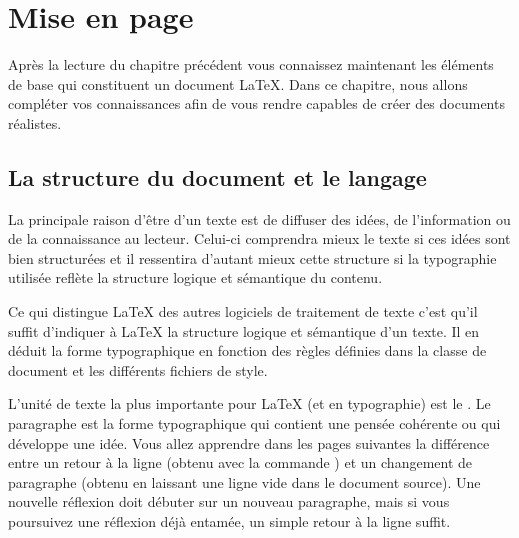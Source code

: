 

\chapter{Mise en page}
\thispagestyle{plain}

\begin{intro}
  Après la lecture du chapitre précédent vous connaissez maintenant
  les éléments de base qui constituent un document \LaTeX{}. Dans ce
  chapitre, nous allons compléter vos connaissances afin de vous
  rendre capables de créer des documents réalistes.
\end{intro}

\section{La structure du document et le langage}

La principale raison d'être d'un texte est de diffuser des idées, de
l'information ou de la connaissance au lecteur. Celui-ci comprendra
mieux le texte si ces idées sont bien structurées et il
ressentira d'autant mieux cette structure si la typographie utilisée
reflète la structure logique et sémantique du contenu.

Ce qui distingue \LaTeX{} des autres logiciels de traitement de texte
c'est qu'il suffit d'indiquer à \LaTeX{} la structure logique et
sémantique d'un texte. Il en déduit la forme typographique en fonction
des \og règles \fg{} définies dans la classe de document et les différents
fichiers de style.

L'unité de texte la plus importante pour \LaTeX{} (et en typographie)
est le .  Le paragraphe est la forme typographique qui
contient une pensée cohérente ou qui développe une idée. Vous allez
apprendre dans les pages suivantes la différence entre un retour à la
ligne (obtenu avec la commande \texttt{\bs\bs}) et un changement de
paragraphe (obtenu en laissant une ligne vide dans le document
source). Une nouvelle réflexion doit débuter sur un nouveau
paragraphe, mais si vous poursuivez une réflexion déjà entamée, un
simple retour à la ligne suffit.

